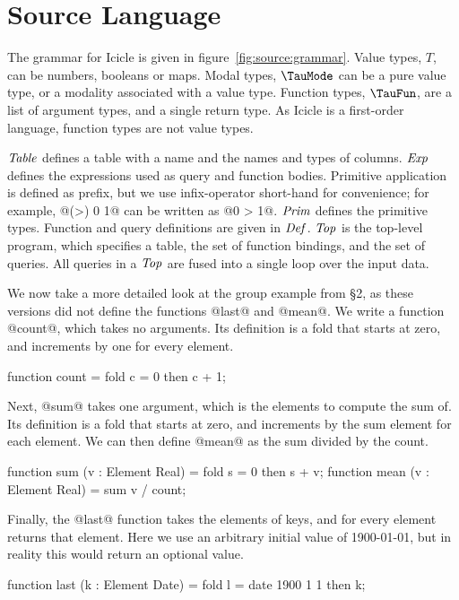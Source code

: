 \eject
\section{Source Language}
\label{s:IcicleSource}





The grammar for Icicle is given in figure~\ref{fig:source:grammar}.
Value types, $T$, can be numbers, booleans or maps.
Modal types, $\TauMode$ can be a pure value type, or a modality associated with a value type.
Function types, $\TauFun$, are a list of argument types, and a single return type.
As Icicle is a first-order language, function types are not value types.


$\mathit{Table}$ defines a table with a name and the names and types of columns.
$\mathit{Exp}$ defines the expressions used as query and function bodies.
Primitive application is defined as prefix, but we use infix-operator short-hand for convenience; for example, @(>) 0 1@ can be written as @0 > 1@.
$\mathit{Prim}$ defines the primitive types.
Function and query definitions are given in $\mathit{Def}$.
$\mathit{Top}$ is the top-level program, which specifies a table, the set of function bindings, and the set of queries.
All queries in a $\mathit{Top}$ are fused into a single loop over the input data.

We now take a more detailed look at the group example from \S2, as these versions did not define the functions @last@ and @mean@.
We write a function @count@, which takes no arguments.
Its definition is a fold that starts at zero, and increments by one for every element.
\begin{code}
  function count
   = fold c = 0 then c + 1;
\end{code}

Next, @sum@ takes one argument, which is the elements to compute the sum of.
Its definition is a fold that starts at zero, and increments by the sum element for each element.
We can then define @mean@ as the sum divided by the count.
\begin{code}
  function sum  (v : Element Real)
   = fold s = 0 then s + v;
  function mean (v : Element Real)
   = sum v / count;
\end{code}

Finally, the @last@ function takes the elements of keys, and for every element returns that element.
Here we use an arbitrary initial value of 1900-01-01, but in reality this would return an optional value.
\begin{code}
  function last (k : Element Date)
   = fold l = date 1900 1 1 then k;
\end{code}


